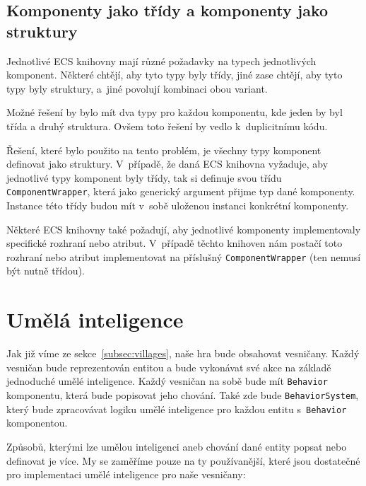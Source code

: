 \subsection{Komponenty jako třídy a komponenty jako struktury}
\label{sec:components-analysis}
Jednotlivé ECS knihovny mají různé požadavky na typech jednotlivých komponent. Některé chtějí, aby tyto typy byly třídy, jiné zase chtějí, aby tyto typy byly struktury, a~jiné povolují kombinaci obou variant.

Možné řešení by bylo mít dva typy pro každou komponentu, kde jeden by byl třída a druhý struktura. Ovšem toto řešení by vedlo k~duplicitnímu kódu.

Řešení, které bylo použito na tento problém, je všechny typy komponent definovat jako struktury. V~případě, že daná ECS knihovna vyžaduje, aby jednotlivé typy komponent byly třídy, tak si definuje svou třídu \texttt{ComponentWrapper}, která jako generický argument přijme typ dané komponenty. Instance této třídy budou mít v~sobě uloženou instanci konkrétní komponenty.

Některé ECS knihovny také požadují, aby jednotlivé komponenty implementovaly specifické rozhraní nebo atribut. V~případě těchto knihoven nám postačí toto rozhraní nebo atribut implementovat na příslušný \texttt{ComponentWrapper} (ten nemusí být nutně třídou).

\section{Umělá inteligence}
\label{sec:ai}
Jak již víme ze sekce~\ref{subsec:villages}, naše hra bude obsahovat vesničany. Každý vesničan bude reprezentován entitou a bude vykonávat své akce na základě jednoduché umělé inteligence. Každý vesničan na sobě bude mít \texttt{Behavior} komponentu, která bude popisovat jeho chování. Také zde bude \texttt{BehaviorSystem}, který bude zpracovávat logiku umělé inteligence pro každou entitu s~\texttt{Behavior} komponentou.

Způsobů, kterými lze umělou inteligenci aneb chování dané entity popsat nebo definovat je více. My se zaměříme pouze na ty používanější, které jsou dostatečné pro implementaci umělé inteligence pro naše vesničany:


